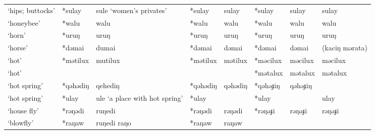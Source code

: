 \begin{landscape}
\begin{longtable}[c]{@{}p{3cm}<{\raggedright}p{2.75cm}<{\raggedright}p{2.75cm}<{\raggedright}p{2.75cm}<{\raggedright}p{2.75cm}<{\raggedright}p{2.75cm}<{\raggedright}p{2.75cm}<{\raggedright}p{2.75cm}<{\raggedright}@{}}
`hips; buttocks'                                     & *sulay             & sule `women's privates'        & *sulay             & sulay                      & *sulay           & sulay                    & sulay                             \\
`honeybee'                                           & *walu              & walu                           & *walu              & walu                       & *walu            & walu                     & walu                              \\
`horn'                                               & *uruŋ              & uruŋ                           & *uruŋ              & uruŋ                       & *uruŋ            & uruŋ                     & uruŋ                              \\
`horse'                                              & *dəmai             & dumai                          & *dəmai             & dəmai                      & *dəmai           & dəmai                    & (kaciŋ mərata)                    \\
`hot'                                                & *mətilux           & mutilux                        & *mətilux           & mətilux                    & *məcilux         & məcilux                  & məcilux                           \\
`hot'                                                &                    &                                &                    &                            & *mətalux         & mətalux                  & mətalux                           \\
`hot spring'                                         & *qəhədiŋ           & qehediŋ                        & *qəhədiŋ           & qəhədiŋ                    & *qəhəɟiŋ         & qəhəɟiŋ                  &                                   \\
`hot spring'                                         & *ulay              & ule `a place with hot spring'  & *ulay              &                            & *ulay            &                          & ulay                              \\
`house fly'                                          & *rəŋədi            & ruŋedi                         & *rəŋədi            & rəŋədi                     & *rəŋəɟi          & rəŋəɟi                   & rəŋəɟi                            \\
`blowfly'                                            & *raŋaw             & ruŋedi raŋo                    & *raŋaw             & raŋaw                      &                  &                          &                                   \\

\end{longtable}
\end{landscape}
